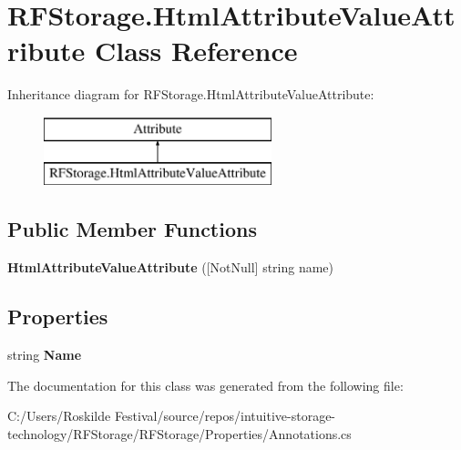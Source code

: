 \section{R\+F\+Storage.\+Html\+Attribute\+Value\+Attribute Class Reference}
\label{class_r_f_storage_1_1_html_attribute_value_attribute}
Inheritance diagram for R\+F\+Storage.\+Html\+Attribute\+Value\+Attribute\+:\begin{figure}[H]
\begin{center}
\leavevmode
\includegraphics[height=2.000000cm]{class_r_f_storage_1_1_html_attribute_value_attribute}
\end{center}
\end{figure}
\subsection*{Public Member Functions}
\begin{DoxyCompactItemize}
\item 
\mbox{\label{class_r_f_storage_1_1_html_attribute_value_attribute_a0c0f6211ce3bf6e378624aa7172c2a5d}} 
{\bfseries Html\+Attribute\+Value\+Attribute} ([Not\+Null] string name)
\end{DoxyCompactItemize}
\subsection*{Properties}
\begin{DoxyCompactItemize}
\item 
\mbox{\label{class_r_f_storage_1_1_html_attribute_value_attribute_ae39c49f06e17a4d6d3201f57917747d3}} 
string {\bfseries Name}\hspace{0.3cm}{\ttfamily  [get]}
\end{DoxyCompactItemize}


The documentation for this class was generated from the following file\+:\begin{DoxyCompactItemize}
\item 
C\+:/\+Users/\+Roskilde Festival/source/repos/intuitive-\/storage-\/technology/\+R\+F\+Storage/\+R\+F\+Storage/\+Properties/Annotations.\+cs\end{DoxyCompactItemize}
